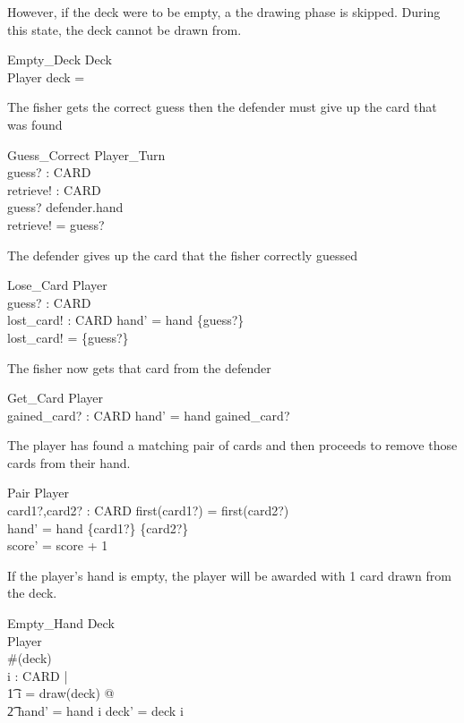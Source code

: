 \documentclass{article}
\begin{document}
However, if the deck were to be empty, a the drawing phase is skipped.
During this state, the deck cannot be drawn from.
\begin{schema}{Empty\_Deck}
    \Xi Deck \\
    \Xi Player
    \where
    deck = \emptyset
\end{schema}

The fisher gets the correct guess then the defender must
give up the card that was found
\begin{schema}{Guess\_Correct}
    \Xi Player\_Turn \\
    guess? : CARD \\
    retrieve! : CARD\\
    \where
    guess? \in defender.hand \\
    retrieve! = guess?
\end{schema}

The defender gives up the card that the fisher correctly guessed
\begin{schema}{Lose\_Card}
    \Delta Player \\
    guess? : CARD \\
    lost\_card! : \power CARD
    \where
    hand' = hand \setminus \{guess?\} \\
    lost\_card! = \{guess?\}
\end{schema}

The fisher now gets that card from the defender
\begin{schema}{Get\_Card}
    \Delta Player \\
    gained\_card? : \power CARD
    \where
    hand' = hand \cup gained\_card? \\
\end{schema}

The player has found a matching pair of cards and then proceeds
to remove those cards from their hand.
\begin{schema}{Pair}
    \Delta Player \\
    card1?,card2? : CARD
    \where
    first(card1?) = first(card2?) \\
    hand' = hand \setminus \{card1?\} \cup \{card2?\} \\ 
    score' = score + 1
\end{schema}

If the player's hand is empty, the player will be awarded with
1 card drawn from the deck.
\begin{schema}{Empty\_Hand}
    \Delta Deck \\
    \Delta Player \\
    \where
    \#(deck)  \\
    \forall i : \power CARD | \\
    \t1 i = draw(deck) @ \\
    \t2 hand' = hand \cup i \land deck' = deck \setminus i \\
\end{schema}
\end{document}
